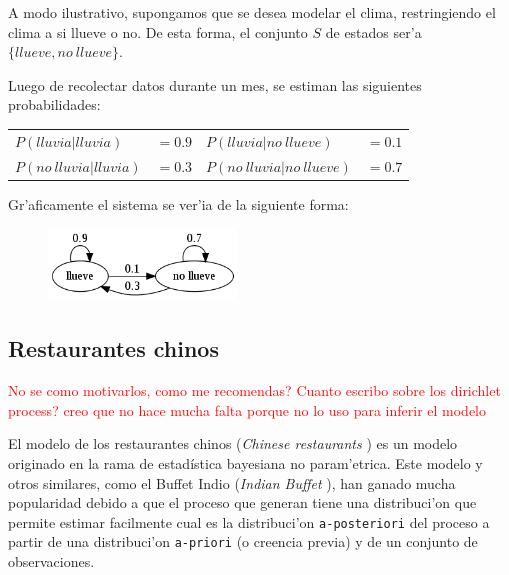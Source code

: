 A modo ilustrativo, supongamos que se desea modelar el clima, restringiendo el clima a si llueve o no. De esta forma, el conjunto $S$ de estados
ser'a $\{llueve, no\ llueve\}$. 

Luego de recolectar datos durante un mes, se estiman las siguientes probabilidades:

\begin{center}
\begin{tabular}{l l l l}
$P(lluvia | lluvia) $ & $=0.9$ & $P(lluvia | no\ llueve) $& $=0.1$\\
$P(no\ lluvia | lluvia)  $ & $=0.3$ & $P(no\ lluvia | no\ llueve) $ & $=0.7$\\
\end{tabular}
\end{center}

Gr'aficamente el sistema se ver'ia de la siguiente forma:

\begin{figure}[h]
\begin{center}
\includegraphics[width=5cm]{images/weather_graph.png}
\end{center}
\end{figure}




\subsection{Restaurantes chinos}
\textcolor{red}{No se como motivarlos, como me recomendas?}\newline 
\textcolor{red}{Cuanto escribo sobre los dirichlet process? creo que no hace mucha falta porque no lo uso para inferir el modelo} 

El modelo de los restaurantes chinos (\emph{Chinese restaurants} \cita) es un modelo originado en la rama de estad\'istica bayesiana no param'etrica.
Este modelo y otros similares, como el Buffet Indio (\emph{Indian Buffet} \cita), han ganado mucha popularidad debido a que el proceso que generan
tiene una distribuci'on que permite estimar facilmente cual es la distribuci'on \texttt{a-posteriori} del proceso a partir de una distribuci'on 
\texttt{a-priori} (o creencia previa) y de un conjunto de observaciones.

